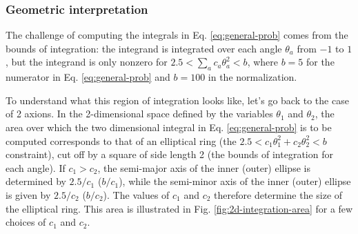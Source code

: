 \documentclass{article}
\begin{document}
\subsubsection{Geometric interpretation}
\label{subsubsec:geom-interpret}
The challenge of computing the integrals in Eq. \eqref{eq:general-prob} comes from the bounds of integration: the integrand is integrated over each angle $\theta_a$ from $-1$ to $1$, but the integrand is only nonzero for $2.5<\sum_a c_a\theta_a^2<b$, where $b=5$ for the numerator in Eq. \eqref{eq:general-prob} and $b=100$ in the normalization.

To understand what this region of integration looks like, let's go back to the case of 2 axions. In the 2-dimensional space defined by the variables $\theta_1$ and $\theta_2$, the area over which the two dimensional integral in Eq. \eqref{eq:general-prob} is to be computed corresponds to that of an elliptical ring (the $2.5<c_1\theta_1^2+c_2\theta_2^2<b$ constraint), cut off by a square of side length 2 (the bounds of integration for each angle). If $c_1>c_2$, the semi-major axis of the inner (outer) ellipse is determined by $2.5/c_1$ ($b/c_1$), while the semi-minor axis of the inner (outer) ellipse is given by $2.5/c_2$ ($b/c_2$). The values of $c_1$ and $c_2$ therefore determine the size of the elliptical ring. This area is illustrated in Fig. \ref{fig:2d-integration-area} for a few choices of $c_1$ and $c_2$.
\end{document}
